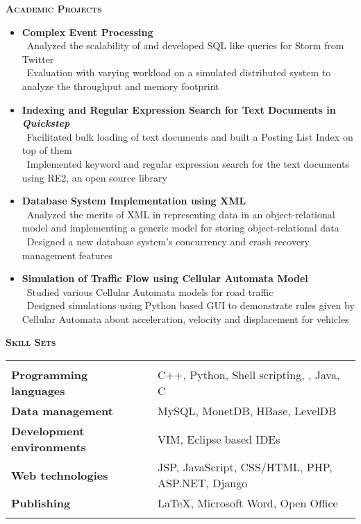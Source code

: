 \documentclass[11pt]{article}
\newcommand{\graybox}[1]{\begin{mdframed}[backgroundcolor=light-gray, linecolor=light-gray, roundcorner=10pt, shadow=false, shadowsize=1pt]
\Large{\textbf{\textsc{#1}}}
\end{mdframed}}
\begin{document}
\graybox{Academic Projects}
\begin{itemize}\addtolength{\itemsep}{-0.5\baselineskip}%
\item{\textbf{Complex Event Processing}}\\
	\textendash\ Analyzed the scalability of and developed SQL like queries for Storm from Twitter\\
	\textendash\ Evaluation with varying workload on a simulated distributed system to analyze the throughput and memory footprint\\
\item{\textbf{Indexing and Regular Expression Search for Text Documents in \textit{Quickstep}}}\\
	\textendash\ Facilitated bulk loading of text documents and built a Posting List Index on top of them\\
	\textendash\ Implemented keyword and regular expression search for the text documents using RE2, an open source library\\
\item{\textbf{Database System Implementation using XML}}\\
	\textendash\ Analyzed the merits of XML in representing data in an object-relational model and implementing a generic model for storing object-relational data\\
	\textendash\ Designed a new database system's concurrency and crash recovery management features\\
	\item{\textbf{Simulation of Traffic Flow using Cellular Automata Model}}\\
	\textendash\ Studied various Cellular Automata models for road traffic\\
	\textendash\ Designed simulations using Python based GUI to demonstrate rules given by Cellular Automata about acceleration, velocity and displacement for vehicles\\
\end{itemize}
\graybox{Skill Sets}
\begin{tabular}{l  c  l}
 & \\
\textbf{Programming languages} & & \quad C++, Python, Shell scripting, , Java, C\\
\textbf{Data management} & & \quad MySQL, MonetDB, HBase, LevelDB\\
\textbf{Development environments} & & \quad VIM, Eclipse based IDEs\\
\textbf{Web technologies} & & \quad JSP, JavaScript, CSS/HTML, PHP, ASP.NET, Django\\
\textbf{Publishing} & & \quad \LaTeX, Microsoft Word, Open Office\\ \\
\end{tabular}
\end{document}
